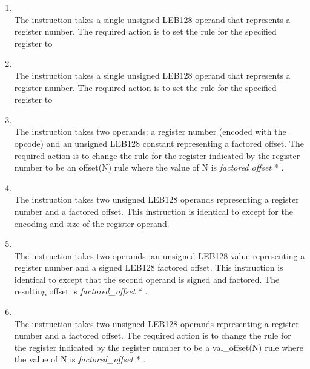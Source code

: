 \begin{enumerate}[1. ]

\item \textbf{\DWCFAundefinedTARG} \\
The \DWCFAundefinedNAME{} instruction takes a single unsigned
LEB128 operand that represents a register number. The required
action is to set the rule for the specified register to

\item \textbf{\DWCFAsamevalueTARG} \\
The \DWCFAsamevalueNAME{} instruction takes a single unsigned
LEB128 operand that represents a register number. The required
action is to set the rule for the specified register to

\item \textbf{\DWCFAoffsetTARG} \\
The \DWCFAoffsetNAME{} instruction takes two operands: a register
number (encoded with the opcode) and an unsigned LEB128
constant representing a factored offset. The required action
is to change the rule for the register indicated by the
register number to be an offset(N) rule where the value of
N is 
\textit{factored offset} * .

\item \textbf{\DWCFAoffsetextendedTARG} \\
The \DWCFAoffsetextendedNAME{} 
instruction takes two unsigned LEB128 
operands representing a register number and a factored
offset. This instruction is identical to
\DWCFAoffset{} 
except for the encoding and size of the register operand.

\item \textbf{\DWCFAoffsetextendedsfTARG} \\
The \DWCFAoffsetextendedsfNAME{} 
instruction takes two operands:
an unsigned LEB128 
value representing a register number and a
signed LEB128 factored offset. This instruction is identical
to \DWCFAoffsetextended{} 
except that the second operand is
signed and factored. The resulting offset is 
\textit{factored\_offset} * .

\item \textbf{\DWCFAvaloffsetTARG} \\
The \DWCFAvaloffsetNAME{} 
instruction takes two unsigned
LEB128 operands representing a register number and a
factored offset. The required action is to change the rule
for the register indicated by the register number to be a
val\_offset(N) rule where the value of N is 
\textit{factored\_offset} * .


\end{enumerate}
